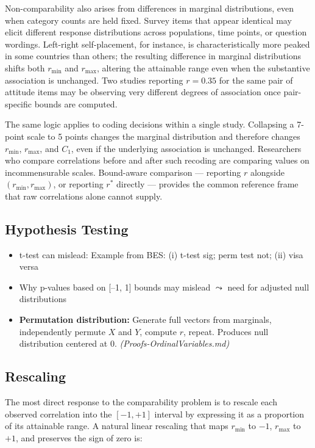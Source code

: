 \documentclass[
  12pt,
]{article}
\providecommand{\tightlist}{%
  \setlength{\itemsep}{0pt}\setlength{\parskip}{0pt}}
\theoremstyle{plain}
\theoremstyle{definition}
\theoremstyle{remark}
\begin{document}
Non-comparability also arises from differences in marginal
distributions, even when category counts are held fixed. Survey items
that appear identical may elicit different response distributions across
populations, time points, or question wordings. Left-right
self-placement, for instance, is characteristically more peaked in some
countries than others; the resulting difference in marginal
distributions shifts both \(r_{\min}\) and \(r_{\max}\), altering the
attainable range even when the substantive association is unchanged. Two
studies reporting \(r = 0.35\) for the same pair of attitude items may
be observing very different degrees of association once pair-specific
bounds are computed.

The same logic applies to coding decisions within a single study.
Collapsing a 7-point scale to 5 points changes the marginal distribution
and therefore changes \(r_{\min}\), \(r_{\max}\), and \(C_1\), even if
the underlying association is unchanged. Researchers who compare
correlations before and after such recoding are comparing values on
incommensurable scales. Bound-aware comparison --- reporting \(r\)
alongside \((r_{\min}, r_{\max})\), or reporting \(r^*\) directly ---
provides the common reference frame that raw correlations alone cannot
supply.

\subsection{Hypothesis Testing}\label{sec-implications-hyp}

\begin{itemize}
\tightlist
\item
  t-test can mislead: Example from BES: (i) t-test sig; perm test not;
  (ii) visa versa
\item
  Why p-values based on {[}--1, 1{]} bounds may mislead \(\leadsto\)
  need for adjusted null distributions
\item
  \textbf{Permutation distribution:} Generate full vectors from
  marginals, independently permute \(X\) and \(Y\), compute \(r\),
  repeat. Produces null distribution centered at 0.
  \emph{(Proofs-OrdinalVariables.md)}
\end{itemize}

\subsection{Rescaling}\label{sec-implications-resc}

The most direct response to the comparability problem is to rescale each
observed correlation into the \([-1, +1]\) interval by expressing it as
a proportion of its attainable range. A natural linear rescaling that
maps \(r_{\min}\) to \(-1\), \(r_{\max}\) to \(+1\), and preserves the
sign of zero is:
\end{document}
